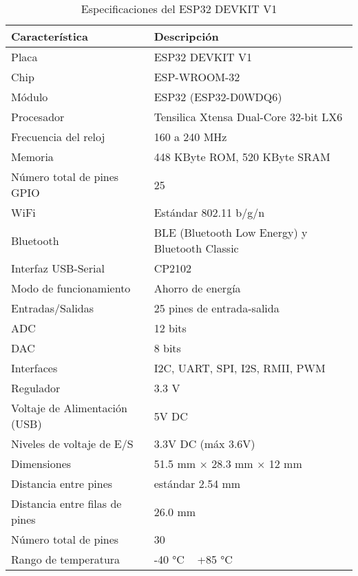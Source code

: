 \begin{table}[h!]
    \centering
    \caption{Especificaciones del ESP32 DEVKIT V1}
    \begin{tabular}{p{6cm}p{9cm}}
        \toprule
        \textbf{Característica} & \textbf{Descripción} \\ 
        \midrule
        Placa & ESP32 DEVKIT V1 \\
        Chip & ESP-WROOM-32 \\
        Módulo & ESP32 (ESP32-D0WDQ6) \\
        Procesador & Tensilica Xtensa Dual-Core 32-bit LX6 \\
        Frecuencia del reloj & 160 a 240 MHz \\
        Memoria & 448 KByte ROM, 520 KByte SRAM \\
        Número total de pines GPIO & 25 \\
        WiFi & Estándar 802.11 b/g/n \\
        Bluetooth & BLE (Bluetooth Low Energy) y Bluetooth Classic \\
        Interfaz USB-Serial & CP2102 \\
        Modo de funcionamiento & Ahorro de energía \\
        Entradas/Salidas & 25 pines de entrada-salida \\
        ADC & 12 bits \\
        DAC & 8 bits \\
        Interfaces & I2C, UART, SPI, I2S, RMII, PWM \\
        Regulador & 3.3 V \\
        Voltaje de Alimentación (USB) & 5V DC \\
        Niveles de voltaje de E/S & 3.3V DC (máx 3.6V) \\
        Dimensiones & 51.5 mm $\times$ 28.3 mm $\times$ 12 mm \\
        Distancia entre pines & estándar 2.54 mm \\
        Distancia entre filas de pines & 26.0 mm \\
        Número total de pines & 30 \\
        Rango de temperatura & -40 °C ~ +85 °C \\
        \bottomrule
    \end{tabular}
    \label{tab:esp32_specs}
\end{table}

\vspace{0.5cm} 

